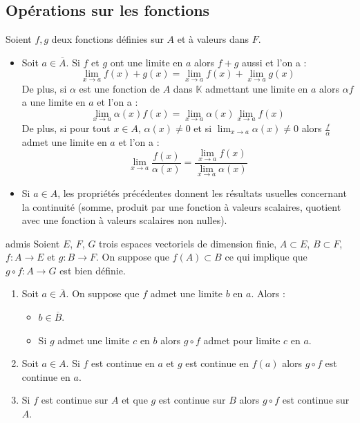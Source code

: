 \documentclass[a4paper,10pt]{report}
\begin{document}
\subsection{Opérations sur les fonctions}

\begin{Proposition}{} Soient $f,g$ deux fonctions définies sur $A$ et à valeurs dans $F$.

\begin{itemize}
\item Soit $a \in \overline{A}$. Si $f$ et $g$ ont une limite en $a$ alors $f+g$ aussi et l'on a :
$$ \lim_{x \rightarrow a} f(x)+g(x) = \lim_{x \rightarrow a} f(x) +  \lim_{x \rightarrow a} g(x)$$
De plus, si $\alpha$ est une fonction de $A$ dans $\mathbb{K}$ admettant une limite en $a$ alors $\alpha f$ a une limite en $a$ et l'on a :
$$  \lim_{x \rightarrow a} \alpha(x) f(x) =  \lim_{x \rightarrow a} \alpha(x)  \lim_{x \rightarrow a} f(x)$$
De plus, si pour tout $x \in A$, $\alpha(x) \neq 0$ et si $\lim_{x \rightarrow a} \alpha(x) \neq 0$ alors $\frac{f}{\alpha}$ admet une limite en $a$ et l'on a :
$$ \lim_{x \rightarrow a} \frac{f(x)}{\alpha(x)} = \frac{ \lim_{x \rightarrow a} f(x)}{ \lim_{x \rightarrow a} \alpha(x)}$$
\item Si $a \in A$, les propriétés précédentes donnent les résultats usuelles concernant la continuité (somme, produit par une fonction à valeurs scalaires, quotient avec une fonction à valeurs scalaires non nulles). 
\end{itemize}
\end{Proposition}

\begin{Proposition}{admis}
Soient $E$, $F$, $G$ trois espaces vectoriels de dimension finie, $A \subset E$, $B \subset F$, $f : A \rightarrow E$ et $g : B \rightarrow F$. On suppose que $f(A) \subset B$ ce qui implique que $g \circ f : A \rightarrow G$ est bien définie.

\begin{enumerate}
\item Soit $a \in \overline{A}$. On suppose que $f$ admet une limite $b$ en $a$. Alors :
\begin{itemize}
\item $b \in \overline{B}$.
\item Si $g$ admet une limite $c$ en $b$ alors $g \circ f$ admet pour limite $c$ en $a$.
\end{itemize}
\item Soit $a \in A$. Si $f$ est continue en $a$ et $g$ est continue en $f(a)$ alors $g \circ f$ est continue en $a$.
\item Si $f$ est continue sur $A$ et que $g$ est continue sur $B$ alors $g \circ f$ est continue sur $A$.
\end{enumerate}
\end{Proposition}
\end{document}
